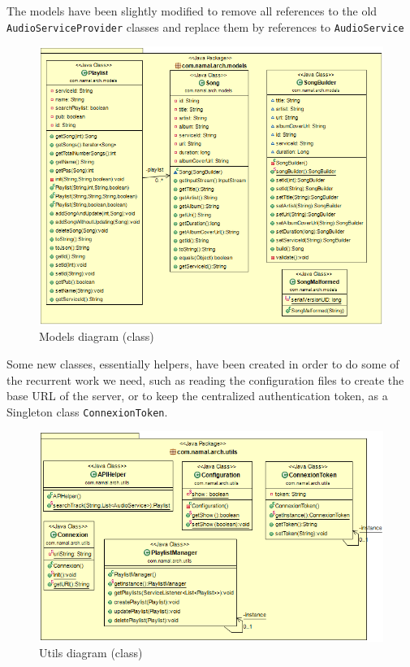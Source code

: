 \documentclass{report}
\begin{document}
{The models have been slightly modified to remove all references to the old \texttt{AudioServiceProvider} classes and replace them by references to \texttt{AudioService}
\begin{center}
\begin{figure}[H]

  \includegraphics[scale=0.4]{class/modelsClient.png}
  \caption{Models diagram (class)}
  \label{modelsClient}
\end{figure}
\end{center}

Some new classes, essentially helpers, have been created in order to do some of the recurrent work we need, such as reading the configuration files to create the base URL of the server, or to keep the centralized authentication token, as a Singleton class \texttt{ConnexionToken}.
\begin{center}
\begin{figure}[H]

  \includegraphics[scale=0.4]{class/utilsClient.png}
  \caption{Utils diagram (class)}
  \label{utilsClient}
\end{figure}
\end{center}
}
\end{document}
